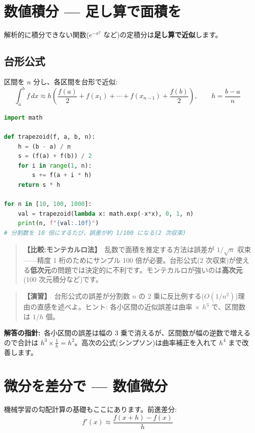 \documentclass{article}
\begin{document}
\section{数値積分 — 足し算で面積を}

解析的に積分できない関数(\(e^{-x^2}\) など)の定積分は\textbf{足し算で近似}します。

\subsection{台形公式}

区間を \(n\) 分し、各区間を台形で近似:
\[ \int_a^b f\,dx \approx h\left( \frac{f(a)}{2} + f(x_1) + \cdots + f(x_{n-1}) + \frac{f(b)}{2} \right), \qquad h = \frac{b-a}{n} \]

\begin{lstlisting}[language=Python]
import math

def trapezoid(f, a, b, n):
    h = (b - a) / n
    s = (f(a) + f(b)) / 2
    for i in range(1, n):
        s += f(a + i * h)
    return s * h

for n in [10, 100, 1000]:
    val = trapezoid(lambda x: math.exp(-x*x), 0, 1, n)
    print(n, f"{val:.10f}")
# 分割数を 10 倍にするたび、誤差が約 1/100 になる(2 次収束)
\end{lstlisting}

\begin{quote}
\textbf{【比較:モンテカルロ法】}\ 乱数で面積を推定する方法は誤差が \(1/\sqrt{n}\) 収束——精度 1 桁のためにサンプル 100 倍が必要。台形公式(2 次収束)が使える\textbf{低次元}の問題では決定的に不利です。モンテカルロが強いのは\textbf{高次元}(100 次元積分など)です。
\end{quote}

\begin{quote}
\textbf{【演習】}\ 台形公式の誤差が分割数 \(n\) の 2 乗に反比例する(\(O(1/n^2)\))理由の直感を述べよ。ヒント: 各小区間の近似誤差は曲率 × \(h^3\) で、区間数は \(1/h\) 個。
\end{quote}

\textbf{解答の指針:}\ 各小区間の誤差は幅の 3 乗で消えるが、区間数が幅の逆数で増えるので合計は \(h^3 \times \frac{1}{h} = h^2\)。高次の公式(シンプソン)は曲率補正を入れて \(h^4\) まで改善します。

\section{微分を差分で — 数値微分}

機械学習の勾配計算の基礎もここにあります。前進差分:
\[ f'(x) \approx \frac{f(x + h) - f(x)}{h} \]
\end{document}
